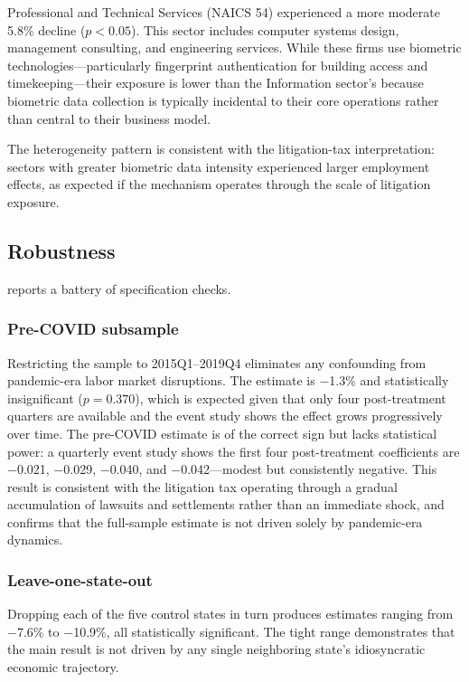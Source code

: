 \documentclass[12pt]{article}
\begin{document}
Professional and Technical Services (NAICS 54) experienced a more moderate 5.8\% decline ($p < 0.05$). This sector includes computer systems design, management consulting, and engineering services. While these firms use biometric technologies---particularly fingerprint authentication for building access and timekeeping---their exposure is lower than the Information sector's because biometric data collection is typically incidental to their core operations rather than central to their business model.

The heterogeneity pattern is consistent with the litigation-tax interpretation: sectors with greater biometric data intensity experienced larger employment effects, as expected if the mechanism operates through the scale of litigation exposure.



\subsection{Robustness}

 reports a battery of specification checks.

\subsubsection*{Pre-COVID subsample} Restricting the sample to 2015Q1--2019Q4 eliminates any confounding from pandemic-era labor market disruptions. The estimate is $-$1.3\% and statistically insignificant ($p = 0.370$), which is expected given that only four post-treatment quarters are available and the event study shows the effect grows progressively over time. The pre-COVID estimate is of the correct sign but lacks statistical power: a quarterly event study shows the first four post-treatment coefficients are $-$0.021, $-$0.029, $-$0.040, and $-$0.042---modest but consistently negative. This result is consistent with the litigation tax operating through a gradual accumulation of lawsuits and settlements rather than an immediate shock, and confirms that the full-sample estimate is not driven solely by pandemic-era dynamics.

\subsubsection*{Leave-one-state-out} Dropping each of the five control states in turn produces estimates ranging from $-$7.6\% to $-$10.9\%, all statistically significant. The tight range demonstrates that the main result is not driven by any single neighboring state's idiosyncratic economic trajectory.
\end{document}
